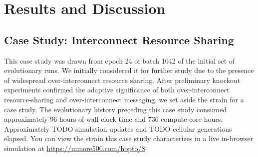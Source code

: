 \section{Results and Discussion} \label{sec:results}









% 

\subsection{Case Study: Interconnect Resource Sharing}



This case study was drawn from epoch 24 of batch 1042 of the initial set of evolutionary runs.
We initially considered it for further study due to the presence of widespread over-interconnect resource sharing.
After preliminary knockout experiments confirmed the adaptive significance of both over-interconnect resource-sharing and over-interconnect messaging, we set aside the strain for a case study.
The evolutionary history preceding this case study consumed approximately 96 hours of wall-clock time and 736 compute-core hours.
Approximately TODO simulation updates and TODO cellular generations elapsed.
You can view the strain this case study characterizes in a live in-browser simulation at \url{https://mmore500.com/hopto/8}

